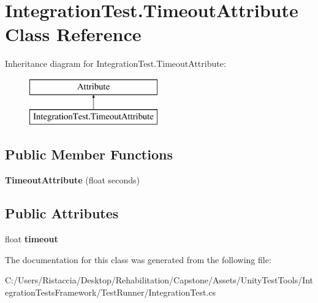 \hypertarget{class_integration_test_1_1_timeout_attribute}{}\section{Integration\+Test.\+Timeout\+Attribute Class Reference}
\label{class_integration_test_1_1_timeout_attribute}
Inheritance diagram for Integration\+Test.\+Timeout\+Attribute\+:\begin{figure}[H]
\begin{center}
\leavevmode
\includegraphics[height=2.000000cm]{class_integration_test_1_1_timeout_attribute}
\end{center}
\end{figure}
\subsection*{Public Member Functions}
\begin{DoxyCompactItemize}
\item 
\mbox{\label{class_integration_test_1_1_timeout_attribute_a16c93a91b24be6576d5dff66e8aded3e}} 
{\bfseries Timeout\+Attribute} (float seconds)
\end{DoxyCompactItemize}
\subsection*{Public Attributes}
\begin{DoxyCompactItemize}
\item 
\mbox{\label{class_integration_test_1_1_timeout_attribute_aac3536d5e51c579b25e582492ec4fc45}} 
float {\bfseries timeout}
\end{DoxyCompactItemize}


The documentation for this class was generated from the following file\+:\begin{DoxyCompactItemize}
\item 
C\+:/\+Users/\+Ristaccia/\+Desktop/\+Rehabilitation/\+Capstone/\+Assets/\+Unity\+Test\+Tools/\+Integration\+Tests\+Framework/\+Test\+Runner/Integration\+Test.\+cs\end{DoxyCompactItemize}
